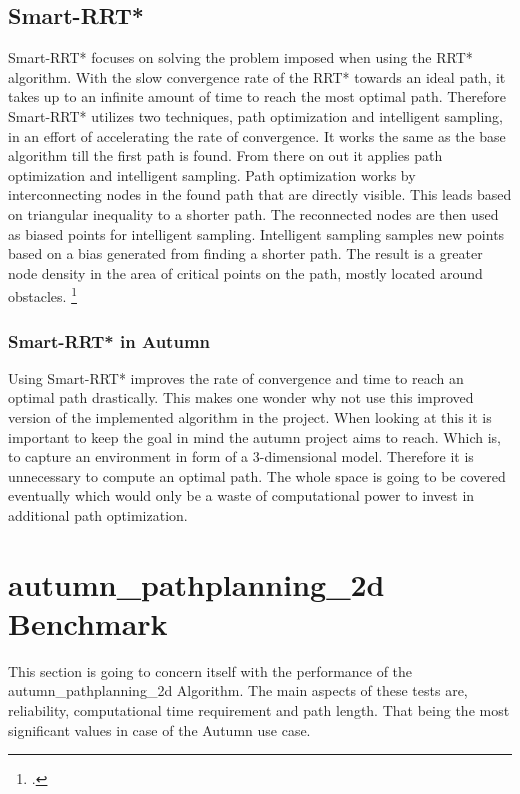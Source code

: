 \subsection{Smart-RRT*}

Smart-RRT* focuses on solving the problem imposed when using the RRT* algorithm. With the slow convergence rate of the RRT* towards an ideal path, it takes up to an infinite amount of time to reach the most optimal path. Therefore Smart-RRT* utilizes two techniques, path optimization and intelligent sampling, in an effort of accelerating the rate of convergence. 
It works the same as the base algorithm till the first path is found. From there on out it applies path optimization and intelligent sampling. Path optimization works by interconnecting nodes in the found path that are directly visible. This leads based on triangular inequality to a shorter path. The reconnected nodes are then used as biased points for intelligent sampling. Intelligent sampling samples new points based on a bias generated from finding a shorter path. The result is a greater node density in the area of critical points on the path, mostly located around obstacles. 
\footcite{Islam2012}

\subsubsection{Smart-RRT* in Autumn}
Using Smart-RRT* improves the rate of convergence and time to reach an optimal path drastically. This makes one wonder why not use this improved version of the implemented algorithm in the project. When looking at this it is important to keep the goal in mind the autumn project aims to reach. Which is, to capture an environment in form of a 3-dimensional model. Therefore it is unnecessary to compute an optimal path. The whole space is going to be covered eventually which would only be a waste of computational power to invest in additional path optimization. 

\section{autumn\_pathplanning\_2d Benchmark}

This section is going to concern itself with the performance of the autumn\_pathplanning\_2d Algorithm. The main aspects of these tests are, reliability, computational time requirement and path length. That being the most significant values in case of the Autumn use case.

